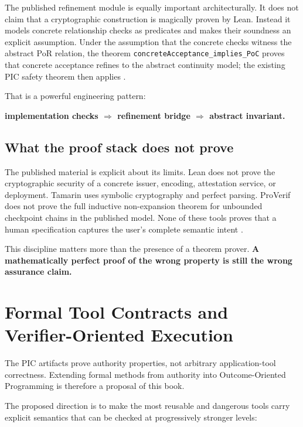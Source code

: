 \documentclass[10pt,oneside,openany]{book}
\newcommand{\mono}[1]{\texttt{#1}}
\begin{document}
The published refinement module is equally important architecturally. It does not claim that a cryptographic construction is magically proven by Lean. Instead it models concrete relationship checks as predicates and makes their soundness an explicit assumption. Under the assumption that the concrete checks witness the abstract PoR relation, the theorem \mono{concreteAcceptance\_implies\_PoC} proves that concrete acceptance refines to the abstract continuity model; the existing PIC safety theorem then applies \cite{piclean}.

That is a powerful engineering pattern:

\begin{center}
\sffamily\bfseries
implementation checks $\Rightarrow$ refinement bridge $\Rightarrow$ abstract invariant.
\end{center}

\section{What the proof stack does not prove}
The published material is explicit about its limits. Lean does not prove the cryptographic security of a concrete issuer, encoding, attestation service, or deployment. Tamarin uses symbolic cryptography and perfect parsing. ProVerif does not prove the full inductive non-expansion theorem for unbounded checkpoint chains in the published model. None of these tools proves that a human specification captures the user's complete semantic intent \cite{picformal}.

This discipline matters more than the presence of a theorem prover. \textbf{A mathematically perfect proof of the wrong property is still the wrong assurance claim.}

\chapter[Formal Tool Contracts and Verifier-Oriented Execution]{Formal Tool Contracts and\texorpdfstring{\\}{ }Verifier-Oriented Execution}\label{ch:toolcontracts}

The PIC artifacts prove authority properties, not arbitrary application-tool correctness. Extending formal methods from authority into Outcome-Oriented Programming is therefore a proposal of this book.

The proposed direction is to make the most reusable and dangerous tools carry explicit semantics that can be checked at progressively stronger levels:
\end{document}
